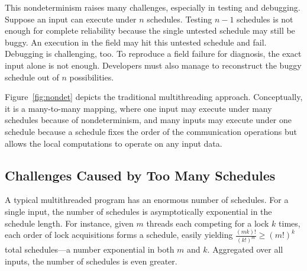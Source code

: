 This nondeterminism raises many challenges, especially in
testing and debugging.  Suppose an input can execute under $n$ schedules.
Testing $n-1$ schedules is not enough for complete reliability because the
single untested schedule may still be buggy.  An execution in the field
may hit this untested schedule and fail.  Debugging is challenging, too.
To reproduce a field failure for diagnosis, the exact input alone is not
enough. Developers must also manage to reconstruct the buggy schedule out
of $n$ possibilities.

Figure~\ref{fig:nondet} depicts the traditional multithreading approach.
Conceptually, it is a many-to-many mapping, where one input may execute
under many schedules because of nondeterminism, and many inputs may
execute under one schedule because a schedule fixes the order of the
communication operations but allows the local computations to operate on
any input data.

\subsection{Challenges Caused by Too Many Schedules}


A typical multithreaded program has an enormous number of schedules.  For
a single input, the number of schedules is asymptotically exponential in
the schedule length.  For instance, given $m$ threads each competing for a
lock $k$ times, each order of lock acquisitions forms a
schedule,
easily yielding $\frac{(mk)!}{(k!)^m} \ge
(m!)^k$ total schedules---a number exponential in both $m$ and $k$.
Aggregated over all inputs, the number of schedules is even greater.

